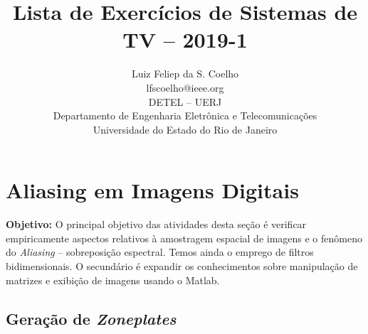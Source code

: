 \documentclass[11pt]{article}
\begin{document}
 

\title{Lista de Exercícios de Sistemas de TV -- 2019-1}
\author{Luiz Feliep da S. Coelho \\ lfscoelho@ieee.org \\ DETEL -- UERJ \\ Departamento de Engenharia Eletrônica e Telecomunicações \\ Universidade do Estado do Rio de Janeiro}

\maketitle


\section{Aliasing em Imagens Digitais}

\textbf{Objetivo:} O principal objetivo das atividades desta seção é verificar empiricamente aspectos relativos à amostragem espacial de imagens e o fenômeno do \emph{Aliasing} -- sobreposição espectral. Temos ainda o emprego de filtros bidimensionais. O secundário é expandir os conhecimentos sobre manipulação de matrizes e exibição de imagens usando o \textsf{Matlab}.

\subsection{Geração de \emph{Zoneplates}}
\end{document}
